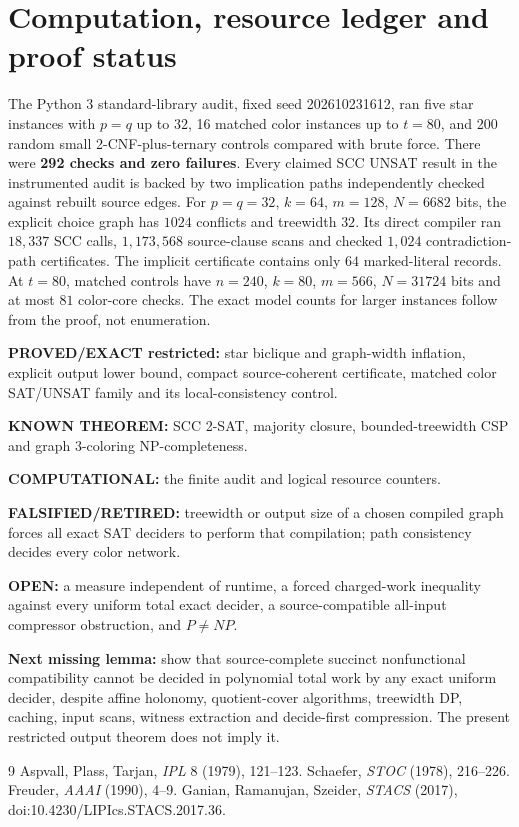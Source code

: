 \documentclass[11pt]{article}
\begin{document}
\section{Computation, resource ledger and proof status}
The Python 3 standard-library audit, fixed seed 202610231612, ran five star instances with $p=q$ up to $32$, 16 matched color instances up to $t=80$, and 200 random small 2-CNF-plus-ternary controls compared with brute force. There were \textbf{292 checks and zero failures}. Every claimed SCC UNSAT result in the instrumented audit is backed by two implication paths independently checked against rebuilt source edges. For $p=q=32$, $k=64$, $m=128$, $N=6682$ bits, the explicit choice graph has $1024$ conflicts and treewidth $32$. Its direct compiler ran $18{,}337$ SCC calls, $1{,}173{,}568$ source-clause scans and checked $1{,}024$ contradiction-path certificates. The implicit certificate contains only $64$ marked-literal records. At $t=80$, matched controls have $n=240$, $k=80$, $m=566$, $N=31724$ bits and at most $81$ color-core checks. The exact model counts for larger instances follow from the proof, not enumeration.
\par\noindent\textbf{PROVED/EXACT restricted:} star biclique and graph-width inflation, explicit output lower bound, compact source-coherent certificate, matched color SAT/UNSAT family and its local-consistency control.
\par\noindent\textbf{KNOWN THEOREM:} SCC 2-SAT, majority closure, bounded-treewidth CSP and graph 3-coloring NP-completeness.
\par\noindent\textbf{COMPUTATIONAL:} the finite audit and logical resource counters.
\par\noindent\textbf{FALSIFIED/RETIRED:} treewidth or output size of a chosen compiled graph forces all exact SAT deciders to perform that compilation; path consistency decides every color network.
\par\noindent\textbf{OPEN:} a measure independent of runtime, a forced charged-work inequality against every uniform total exact decider, a source-compatible all-input compressor obstruction, and $P\ne NP$.
\par\noindent\textbf{Next missing lemma:} show that source-complete succinct nonfunctional compatibility cannot be decided in polynomial total work by any exact uniform decider, despite affine holonomy, quotient-cover algorithms, treewidth DP, caching, input scans, witness extraction and decide-first compression. The present restricted output theorem does not imply it.
\begin{thebibliography}{9}
 Aspvall, Plass, Tarjan, \emph{IPL} 8 (1979), 121--123.
 Schaefer, \emph{STOC} (1978), 216--226.
 Freuder, \emph{AAAI} (1990), 4--9.
 Ganian, Ramanujan, Szeider, \emph{STACS} (2017), doi:10.4230/LIPIcs.STACS.2017.36.
\end{thebibliography}
\end{document}
